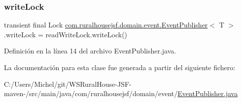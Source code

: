 \mbox{\label{classcom_1_1ruralhousejsf_1_1domain_1_1event_1_1_event_publisher_a1ed2aa95b3bceee1d543a0d0d7297171}} 
\subsubsection{\texorpdfstring{writeLock}{writeLock}}
{\footnotesize\ttfamily transient final Lock \mbox{\hyperlink{classcom_1_1ruralhousejsf_1_1domain_1_1event_1_1_event_publisher}{com.\+ruralhousejsf.\+domain.\+event.\+Event\+Publisher}}$<$ T $>$.write\+Lock = read\+Write\+Lock.\+write\+Lock()\hspace{0.3cm}{\ttfamily [protected]}}



Definición en la línea 14 del archivo Event\+Publisher.\+java.



La documentación para esta clase fue generada a partir del siguiente fichero\+:\begin{DoxyCompactItemize}
\item 
C\+:/\+Users/\+Michel/git/\+W\+S\+Rural\+House-\/\+J\+S\+F-\/maven-\//src/main/java/com/ruralhousejsf/domain/event/\mbox{\hyperlink{_event_publisher_8java}{Event\+Publisher.\+java}}\end{DoxyCompactItemize}
